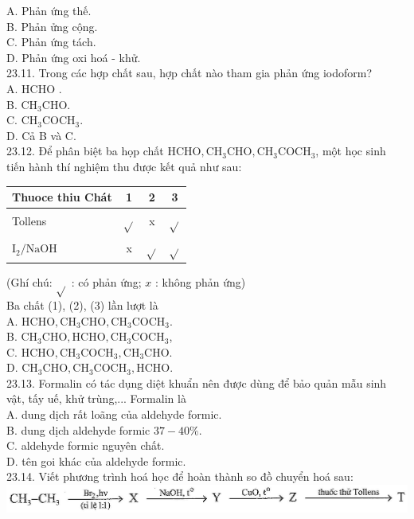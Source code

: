 \documentclass[10pt]{article}
\begin{document}
A. Phản ứng thế.\\
B. Phản ửng cộng.\\
C. Phản ứng tách.\\
D. Phản ứng oxi hoá - khử.\\
23.11. Trong các hợp chất sau, hợp chất nào tham gia phản ứng iodoform?\\
A. HCHO .\\
B. $\mathrm{CH}_{3} \mathrm{CHO}$.\\
C. $\mathrm{CH}_{3} \mathrm{COCH}_{3}$.\\
D. Cả B và C.\\
23.12. Để phân biệt ba họp chất $\mathrm{HCHO}, \mathrm{CH}_{3} \mathrm{CHO}, \mathrm{CH}_{3} \mathrm{COCH}_{3}$, một học sinh tiến hành thí nghiệm thu được kết quả như sau:

\begin{center}
\begin{tabular}{|l|c|c|c|}
\hline
Thuoce thiu Chát & 1 & 2 & 3 \\
\hline
Tollens & $\sqrt{ }$ & x & $\sqrt{ }$ \\
\hline
$\mathrm{I}_{2} / \mathrm{NaOH}$ & x & $\sqrt{ }$ & $\sqrt{ }$ \\
\hline
\end{tabular}
\end{center}

(Ghí chú: $\sqrt{ }$ : có phản ứng; $x$ : không phản ứng)\\
Ba chất (1), (2), (3) lần lượt là\\
A. $\mathrm{HCHO}, \mathrm{CH}_{3} \mathrm{CHO}, \mathrm{CH}_{3} \mathrm{COCH}_{3}$.\\
B. $\mathrm{CH}_{3} \mathrm{CHO}, \mathrm{HCHO}, \mathrm{CH}_{3} \mathrm{COCH}_{3}$,\\
C. $\mathrm{HCHO}, \mathrm{CH}_{3} \mathrm{COCH}_{3}, \mathrm{CH}_{3} \mathrm{CHO}$.\\
D. $\mathrm{CH}_{3} \mathrm{CHO}, \mathrm{CH}_{3} \mathrm{COCH}_{3}, \mathrm{HCHO}$.\\
23.13. Formalin có tác dụng diệt khuẩn nên được dùng để bảo quản mẫu sinh vật, tấy uế, khử trùng,... Formalin là\\
A. dung dịch rất loãng của aldehyde formic.\\
B. dung dịch aldehyde formic $37-40 \%$.\\
C. aldehyde formic nguyên chất.\\
D. tên goi khác của aldehyde formic.\\
23.14. Viết phương trình hoá học để hoàn thành so đồ chuyển hoá sau:\\
\includegraphics[max width=\textwidth, center]{2025_10_23_fa9073eecee116ad8cf2g-79}
\end{document}

